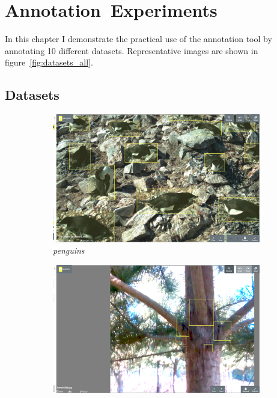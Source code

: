 \chapter{Annotation~Experiments}
\label{chap:annotation} 

In this chapter I demonstrate the practical use of the annotation tool by annotating 10 different datasets. Representative images are shown in figure~\ref{fig:datasets_all}.



\section{Datasets}

\begin{figure}[h!]
\centering
\begin{subfigure}[t]{0.24\linewidth}
  \includegraphics[width=1.0\linewidth]{figures/annotation/screenshots/penguins2.png}
   \caption{\emph{penguins}}
\end{subfigure}%
\begin{subfigure}[t]{0.24\linewidth}
  \includegraphics[width=1.0\linewidth]{figures/annotation/screenshots/branches3.png}

\end{subfigure}
\end{figure}

